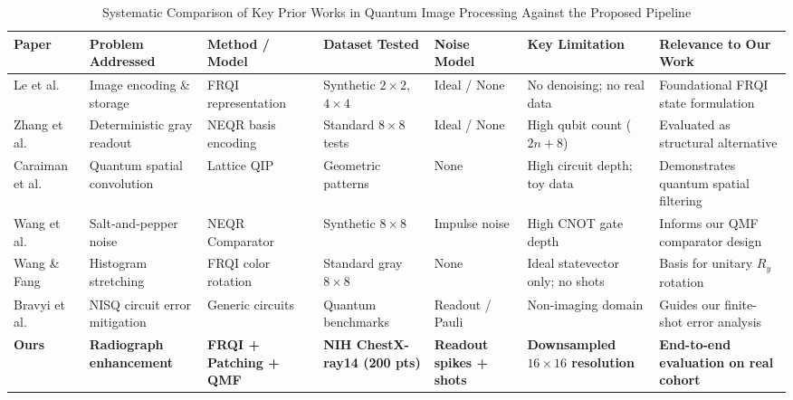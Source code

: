 \documentclass[12pt,onecolumn,draftclsnofoot]{IEEEtran}
\begin{document}
\begin{table}[t]
\centering
\caption{Systematic Comparison of Key Prior Works in Quantum Image Processing Against the Proposed Pipeline}
\label{tab:related_work}
\footnotesize
\renewcommand{\arraystretch}{1.30}
\setlength{\tabcolsep}{3pt}
\begin{tabular}{@{}p{50pt}p{62pt}p{60pt}p{52pt}p{44pt}p{72pt}p{76pt}@{}}
\toprule
\raggedright\textbf{Paper} & \raggedright\textbf{Problem Addressed} & \raggedright\textbf{Method / Model} & \raggedright\textbf{Dataset Tested} & \raggedright\textbf{Noise Model} & \raggedright\textbf{Key Limitation} & \raggedright\textbf{Relevance to Our Work} \tabularnewline
\midrule
\raggedright Le et al. \cite{le2011flexible} & \raggedright Image encoding \& storage & \raggedright FRQI representation & \raggedright Synthetic $2\times2$, $4\times4$ & \raggedright Ideal / None & \raggedright No denoising; no real data & \raggedright Foundational FRQI state formulation \tabularnewline
\addlinespace[3pt]
\raggedright Zhang et al. \cite{zhang2013neqr} & \raggedright Deterministic gray readout & \raggedright NEQR basis encoding & \raggedright Standard $8\times8$ tests & \raggedright Ideal / None & \raggedright High qubit count ($2n+8$) & \raggedright Evaluated as structural alternative \tabularnewline
\addlinespace[3pt]
\raggedright Caraiman et al. \cite{caraiman2014image} & \raggedright Quantum spatial convolution & \raggedright Lattice QIP & \raggedright Geometric patterns & \raggedright None & \raggedright High circuit depth; toy data & \raggedright Demonstrates quantum spatial filtering \tabularnewline
\addlinespace[3pt]
\raggedright Wang et al. \cite{wang2022quantum} & \raggedright Salt-and-pepper noise & \raggedright NEQR Comparator & \raggedright Synthetic $8\times8$ & \raggedright Impulse noise & \raggedright High CNOT gate depth & \raggedright Informs our QMF comparator design \tabularnewline
\addlinespace[3pt]
\raggedright Wang \& Fang \cite{wang2020quantum} & \raggedright Histogram stretching & \raggedright FRQI color rotation & \raggedright Standard gray $8\times8$ & \raggedright None & \raggedright Ideal statevector only; no shots & \raggedright Basis for unitary $R_y$ rotation \tabularnewline
\addlinespace[3pt]
\raggedright Bravyi et al. \cite{bravyi2021error} & \raggedright NISQ circuit error mitigation & \raggedright Generic circuits & \raggedright Quantum benchmarks & \raggedright Readout / Pauli & \raggedright Non-imaging domain & \raggedright Guides our finite-shot error analysis \tabularnewline
\addlinespace[3pt]
\raggedright \textbf{Ours} & \raggedright \textbf{Radiograph enhancement} & \raggedright \textbf{FRQI + Patching + QMF} & \raggedright \textbf{NIH ChestX-ray14 (200 pts)} & \raggedright \textbf{Readout spikes + shots} & \raggedright \textbf{Downsampled $16\times16$ resolution} & \raggedright \textbf{End-to-end evaluation on real cohort} \tabularnewline
\bottomrule
\end{tabular}
\end{table}
\end{document}
